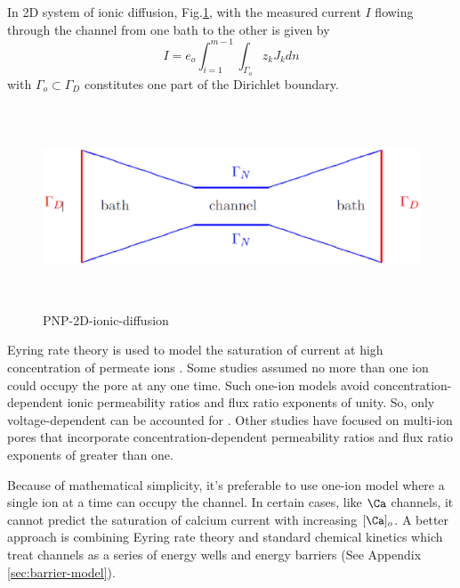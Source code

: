 In 2D system of ionic diffusion, Fig.\ref{fig:PNP-2D-ionic-diffusion}, with the
measured current $I$ flowing through the channel from one bath to the other is
given by
\begin{equation}
I = e_o \int^{m-1}_{i=1} \int_{\Gamma_o}z_k J_k dn
\end{equation}
with $\Gamma_o \subset \Gamma_D$ constitutes one part of the Dirichlet boundary.

\begin{figure}[htb]
  \centerline{\includegraphics[height=6cm]{./images/PNP-2D-ionic-diffusion.eps}}
  \caption{PNP-2D-ionic-diffusion}\label{fig:PNP-2D-ionic-diffusion}
\end{figure}








Eyring rate theory is used to model the saturation of current at high
concentration of permeate ions \citep{lauger1973}. Some studies assumed no
more than one ion could occupy the pore at any one time. Such one-ion models
avoid concentration-dependent ionic permeability ratios and flux ratio exponents
of unity. So, only voltage-dependent can be accounted for \citep{hille1978,
lauger1973, begenisich1979}. Other studies have focused on multi-ion pores
\citep{hille1978, begenisich1979} that incorporate concentration-dependent
permeability ratios and flux ratio exponents of greater than one.

Because of mathematical simplicity, it's preferable to use one-ion model where a
single ion at a time can occupy the channel. In certain cases, like $\Ca$
channels, it cannot predict the saturation of calcium current with increasing
$[\Ca]_o$.  A better approach is combining Eyring rate theory
\citep{eyring1931,eyring1935,eyring1949} and standard chemical kinetics which
treat channels as a series of energy wells and energy barriers (See Appendix
\ref{sec:barrier-model}).

